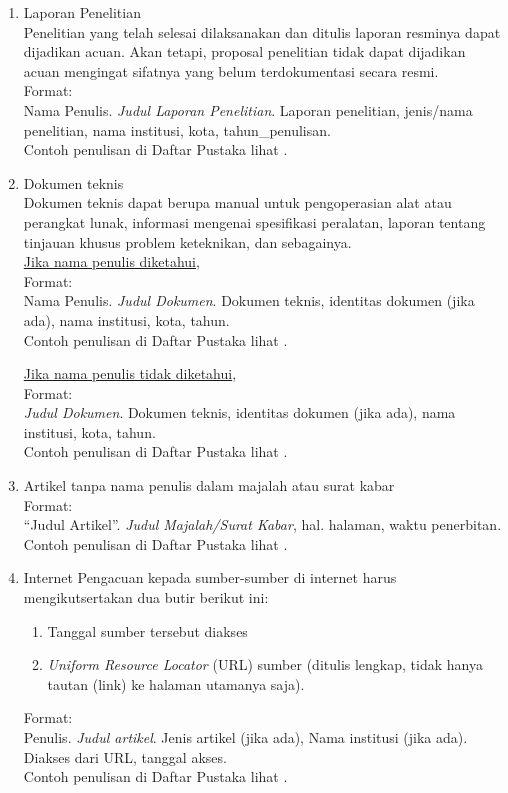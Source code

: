 \begin{enumerate}[label=\alph*)]
\begin{enumerate}[label=\roman*)]
	\item Laporan Penelitian \\
	Penelitian yang telah selesai dilaksanakan dan ditulis laporan resminya dapat
dijadikan acuan. Akan tetapi, proposal penelitian tidak dapat dijadikan acuan
mengingat sifatnya yang belum terdokumentasi secara resmi. \\
Format: \\
Nama Penulis. \textit{Judul Laporan Penelitian}. Laporan penelitian, jenis/nama
penelitian, nama institusi, kota, tahun\_penulisan. \\
Contoh penulisan di Daftar Pustaka lihat \cite{penelitian}.


\item Dokumen teknis \\
Dokumen teknis dapat berupa manual untuk pengoperasian alat atau perangkat
lunak, informasi mengenai spesifikasi peralatan, laporan tentang tinjauan khusus
problem keteknikan, dan sebagainya. \\
\underline{Jika nama penulis diketahui}, \\
Format: \\
Nama Penulis. \textit{Judul Dokumen}. Dokumen teknis, identitas dokumen (jika ada),
nama institusi, kota, tahun. \\
Contoh penulisan di Daftar Pustaka lihat \cite{dokteknama}. 

\vspace{0.5cm}
\underline{Jika nama penulis tidak diketahui}, \\
Format: \\
\textit{Judul Dokumen}. Dokumen teknis, identitas dokumen (jika ada), nama institusi,
kota, tahun. \\

Contoh penulisan di Daftar Pustaka lihat \cite{dokteknonama}. 

\item Artikel tanpa nama penulis dalam majalah atau surat kabar \\
Format: \\
``Judul Artikel''. \textit{Judul Majalah/Surat Kabar}, hal. halaman, waktu penerbitan. \\
Contoh penulisan di Daftar Pustaka lihat \cite{majalah1, majalah2}. 


\item Internet
Pengacuan kepada sumber-sumber di internet harus mengikutsertakan dua butir
berikut ini:
\begin{enumerate}
    \item Tanggal sumber tersebut diakses
     \item \textit{Uniform Resource Locator} (URL) sumber (ditulis lengkap, tidak
hanya tautan (link) ke halaman utamanya saja).
\end{enumerate}
Format: \\
Penulis. \textit{Judul artikel}. Jenis artikel (jika ada), Nama institusi (jika ada). Diakses
dari URL, tanggal akses. \\
Contoh penulisan di Daftar Pustaka lihat \cite{web1, web2}. 


\end{enumerate}
\end{enumerate}

